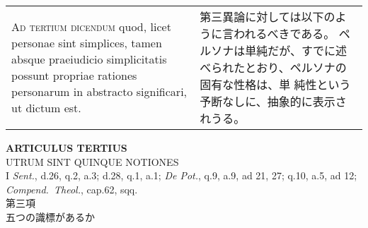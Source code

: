 \documentclass[10pt]{jsarticle} %
\begin{document}
\begin{longtable}{p{21em}p{21em}}
\\



{\scshape Ad tertium dicendum} quod, licet personae sint simplices, tamen absque
praeiudicio simplicitatis possunt propriae rationes personarum in
abstracto significari, ut dictum est.


&

第三異論に対しては以下のように言われるべきである。
ペルソナは単純だが、すでに述べられたとおり、ペルソナの固有な性格は、単
 純性という予断なしに、抽象的に表示されうる。



\end{longtable}
\newpage


\begin{center}
{\Large {\bf ARTICULUS TERTIUS}}\\
{\large UTRUM SINT QUINQUE NOTIONES}\\
{\footnotesize I {\itshape Sent.}, d.26, q.2, a.3; d.28, q.1, a.1;
 {\itshape De Pot.}, q.9, a.9, ad 21, 27; q.10, a.5, ad 12; {\itshape
 Compend.~Theol.}, cap.62, sqq.}\\
{\Large 第三項\\五つの識標があるか}
\end{center}
\end{document}
